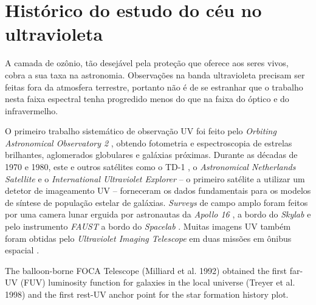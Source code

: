 
\section{Histórico do estudo do céu no ultravioleta}
\label{sec:Galex:CeuUV}

A camada de ozônio, tão desejável pela proteção que oferece aos seres vivos,
cobra a sua taxa na astronomia. Observações na banda ultravioleta precisam ser
feitas fora da atmosfera terrestre, portanto não é de se estranhar que o
trabalho nesta faixa espectral tenha progredido menos do que na faixa do óptico
e do infravermelho.\citneed

O primeiro trabalho sistemático de observação UV foi feito pelo {\em Orbiting
Astronomical Observatory 2} \citep{Code1970}, obtendo fotometria e
espectroscopia de estrelas brilhantes, aglomerados globulares e galáxias
próximas. Durante as décadas de 1970 e 1980, este e outros satélites como o TD-1
\citep{Boksenberg1973}, o {\em Astronomical Netherlands Satellite}
\citep{vanDuinen1975} e o {\em International Ultraviolet Explorer}
\citep{Kondo1987} -- o primeiro satélite a utilizar um detetor de imageamento UV
-- forneceram os dados fundamentais para os modelos de síntese de população
estelar de galáxias. {\em Surveys} de campo amplo foram feitos por uma camera
lunar erguida por astronautas da {\em Apollo 16} \citep{Carruthers1973}, a bordo
do {\em Skylab} \citep{Henize1975} e pelo instrumento {\em FAUST} a bordo do
{\em Spacelab} \citep{Bowyer1993}. Muitas imagens UV também foram obtidas pelo
{\em Ultraviolet Imaging Telescope} em duas missões em ônibus espacial
\citep{Stecher1997}.

\cite{Madau1998}
The balloon-borne FOCA Telescope (Milliard et al. 1992) obtained the
first far- UV (FUV) luminosity function for galaxies in the local universe
(Treyer et al. 1998) and the first rest-UV anchor point for the star formation
history plot.



